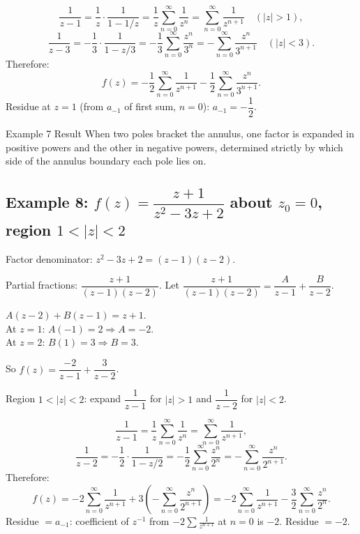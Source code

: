 \documentclass[12pt,a4paper]{article}
\begin{document}
\[
  \frac{1}{z-1} = \frac{1}{z}\cdot\frac{1}{1-1/z} = \frac{1}{z}\sum_{n=0}^{\infty}\frac{1}{z^n}
               = \sum_{n=0}^{\infty}\frac{1}{z^{n+1}} \quad (|z|>1),
\]
\[
  \frac{1}{z-3} = -\frac{1}{3}\cdot\frac{1}{1-z/3} = -\frac{1}{3}\sum_{n=0}^{\infty}\frac{z^n}{3^n}
               = -\sum_{n=0}^{\infty}\frac{z^n}{3^{n+1}} \quad (|z|<3).
\]
Therefore:
\[
  f(z) = -\frac{1}{2}\sum_{n=0}^{\infty}\frac{1}{z^{n+1}}
         -\frac{1}{2}\sum_{n=0}^{\infty}\frac{z^n}{3^{n+1}}.
\]
Residue at $z=1$ (from $a_{-1}$ of first sum, $n=0$): $a_{-1} = -\dfrac{1}{2}$.

\begin{learnbox}{Example 7 Result}
When two poles bracket the annulus, one factor is expanded in positive powers and the other in negative powers, determined strictly by which side of the annulus boundary each pole lies on.
\end{learnbox}

\subsection*{Example 8: $f(z)=\dfrac{z+1}{z^2-3z+2}$ about $z_0=0$, region $1<|z|<2$}

Factor denominator: $z^2-3z+2 = (z-1)(z-2)$.

Partial fractions: $\dfrac{z+1}{(z-1)(z-2)}$. Let
$\dfrac{z+1}{(z-1)(z-2)} = \dfrac{A}{z-1}+\dfrac{B}{z-2}$.

$A(z-2)+B(z-1)=z+1$.\\
At $z=1$: $A(-1) = 2 \Rightarrow A = -2$.\\
At $z=2$: $B(1) = 3 \Rightarrow B = 3$.

So $f(z) = \dfrac{-2}{z-1} + \dfrac{3}{z-2}$.

Region $1 < |z| < 2$: expand $\dfrac{1}{z-1}$ for $|z|>1$ and $\dfrac{1}{z-2}$ for $|z|<2$.

\[
  \frac{1}{z-1} = \frac{1}{z}\sum_{n=0}^{\infty}\frac{1}{z^n} = \sum_{n=0}^{\infty}\frac{1}{z^{n+1}},
\]
\[
  \frac{1}{z-2} = -\frac{1}{2}\cdot\frac{1}{1-z/2} = -\frac{1}{2}\sum_{n=0}^{\infty}\frac{z^n}{2^n}
               = -\sum_{n=0}^{\infty}\frac{z^n}{2^{n+1}}.
\]
Therefore:
\[
  f(z) = -2\sum_{n=0}^{\infty}\frac{1}{z^{n+1}} + 3\left(-\sum_{n=0}^{\infty}\frac{z^n}{2^{n+1}}\right)
       = -2\sum_{n=0}^{\infty}\frac{1}{z^{n+1}} - \frac{3}{2}\sum_{n=0}^{\infty}\frac{z^n}{2^{n}}.
\]
Residue $= a_{-1}$: coefficient of $z^{-1}$ from $-2\sum \frac{1}{z^{n+1}}$ at $n=0$ is $-2$.
Residue $= -2$.
\end{document}
